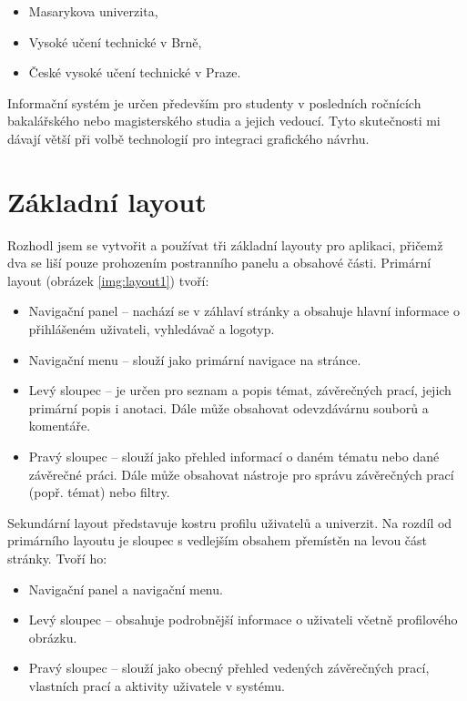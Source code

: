 \begin{itemize}
    \item Masarykova univerzita,
    \item Vysoké učení technické v Brně,
    \item České vysoké učení technické v Praze.
\end{itemize}

Informační systém je určen především pro studenty v posledních ročnících bakalářského nebo magisterského studia a jejich vedoucí. Tyto skutečnosti mi dávají větší  při volbě technologií pro integraci grafického návrhu.

\section{Základní layout}

Rozhodl jsem se vytvořit a používat tři základní layouty pro aplikaci, přičemž dva se liší pouze prohozením postranního panelu a obsahové části. Primární layout (obrázek \ref{img:layout1}) tvoří:

\begin{itemize}
    \item Navigační panel -- nachází se v záhlaví stránky a obsahuje hlavní informace o přihlášeném uživateli, vyhledávač a logotyp.
    \item Navigační menu -- slouží jako primární navigace na stránce.
    \item Levý sloupec -- je určen pro seznam a popis témat, závěrečných prací, jejich primární popis i anotaci. Dále může obsahovat odevzdávárnu souborů a komentáře.
    \item Pravý sloupec -- slouží jako přehled informací o daném tématu nebo dané závěrečné práci. Dále může obsahovat nástroje pro správu závěrečných prací (popř. témat) nebo filtry.
\end{itemize}

Sekundární layout představuje kostru profilu uživatelů a univerzit. Na rozdíl od primárního layoutu je sloupec s vedlejším obsahem přemístěn na levou část stránky. Tvoří ho:

\begin{itemize}
    \item Navigační panel a navigační menu.
    \item Levý sloupec -- obsahuje podrobnější informace o uživateli včetně profilového obrázku.
    \item Pravý sloupec -- slouží jako obecný přehled vedených závěrečných prací, vlastních prací a aktivity uživatele v systému.
\end{itemize}

